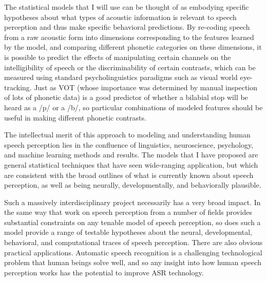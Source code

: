 \documentclass[12pt]{article}
\begin{document}
The statistical models that I will use can be thought of as embodying specific hypotheses about what types of acoustic information is relevant to speech perception and thus make specific behavioral predictions.  By re-coding speech from a raw acoustic form into dimensions corresponding to the features learned by the model, and comparing different phonetic categories on these dimensions, it is possible to predict the effects of manipulating certain channels on the intelligibility of speech or the discriminability of certain contrasts, which can be measured using standard psycholinguistics paradigms such as visual world eye-tracking.  Just as VOT (whose importance was determined by manual inspection of lots of phonetic data) is a good predictor of whether a bilabial stop will be heard as a /p/ or a /b/, so particular combinations of modeled features should be useful in making different phonetic contrasts.

The intellectual merit of this approach to modeling and understanding human speech perception lies in the confluence of linguistics, neuroscience, psychology, and machine learning methods and results.  The models that I have proposed are general statistical techniques that have seen wide-ranging application, but which are consistent with the broad outlines of what is currently known about speech perception, as well as being neurally, developmentally, and behaviorally plausible.

Such a massively interdisciplinary project necessarily has a very broad impact.  In the same way that work on speech perception from a number of fields provides substantial constraints on any tenable model of speech perception, so does such a model provide a range of testable hypotheses about the neural, developmental, behavioral, and computational traces of speech perception.  There are also obvious practical applications.  Automatic speech recognition is a challenging technological problem that human beings solve well, and so any insight into how human speech perception works has the potential to improve ASR technology.  

%


\end{document}
